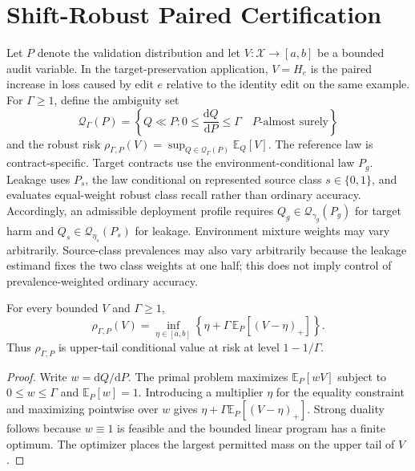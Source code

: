 \section{Shift-Robust Paired Certification}
\label{app:shift-robust-theory}

Let $P$ denote the validation distribution and let $V:\mathcal{X}\to[a,b]$
be a bounded audit variable.  In the target-preservation application,
$V=H_e$ is the paired increase in loss caused by edit $e$ relative to the
identity edit on the same example.  For $\Gamma\geq 1$, define the ambiguity
set
\begin{equation}
  \mathcal{Q}_{\Gamma}(P)=\left\{Q\ll P:
  0\leq \frac{\mathrm{d}Q}{\mathrm{d}P}\leq\Gamma
  \quad P\text{-almost surely}\right\}
\end{equation}
and the robust risk
$\rho_{\Gamma,P}(V)=\sup_{Q\in\mathcal{Q}_{\Gamma}(P)}\mathbb{E}_Q[V]$.
The reference law is contract-specific. Target contracts use the
environment-conditional law $P_g$. Leakage uses $P_s$, the law conditional on
represented source class $s\in\{0,1\}$, and evaluates equal-weight robust
class recall rather than ordinary accuracy. Accordingly, an admissible
deployment profile requires $Q_g\in\mathcal Q_{\gamma_g}(P_g)$ for target
harm and $Q_s\in\mathcal Q_{\eta_s}(P_s)$ for leakage. Environment mixture
weights may vary arbitrarily. Source-class prevalences may also vary
arbitrarily because the leakage estimand fixes the two class weights at one
half; this does not imply control of prevalence-weighted ordinary accuracy.

\begin{lemma}
\label{lem:cvar-identity}
For every bounded $V$ and $\Gamma\geq1$,
\begin{equation}
  \rho_{\Gamma,P}(V)
  =\inf_{\eta\in[a,b]}
  \left\{\eta+\Gamma\,\mathbb{E}_P[(V-\eta)_+]\right\}.
\end{equation}
Thus $\rho_{\Gamma,P}$ is upper-tail conditional value at risk at level
$1-1/\Gamma$.
\end{lemma}

\begin{proof}
Write $w=\mathrm{d}Q/\mathrm{d}P$.  The primal problem maximizes
$\mathbb{E}_P[wV]$ subject to $0\leq w\leq\Gamma$ and
$\mathbb{E}_P[w]=1$.  Introducing a multiplier $\eta$ for the equality
constraint and maximizing pointwise over $w$ gives
$\eta+\Gamma\mathbb{E}_P[(V-\eta)_+]$.  Strong duality follows because
$w\equiv1$ is feasible and the bounded linear program has a finite optimum.
The optimizer places the largest permitted mass on the upper tail of $V$.
\end{proof}

